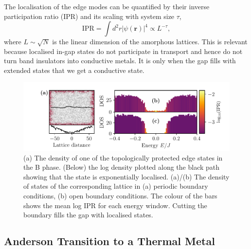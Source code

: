 The localisation of the edge modes can be quantified by their inverse participation ratio (IPR) and its scaling with system size \(\tau\), \[\mathrm{IPR} = \int d^2r|\psi(\mathbf{r})|^4  \propto L^{-\tau},\] where \(L\sim\sqrt{N}\) is the linear dimension of the amorphous lattices. This is relevant because localised in-gap states do not participate in transport and hence do not turn band insulators into conductive metals. It is only when the gap fills with extended states that we get a conductive state.

\hypertarget{fig:edge_modes}{%
\begin{figure}
\centering
\includegraphics[width=1\textwidth,height=\textheight]{figure_code/amk_chapter/results/edge_modes/edge_modes}
\caption[{Edges States and Density of States}]{(a) The density of one of the topologically protected edge states in the B phase. (Below) the log density plotted along the black path showing that the state is exponentially localised. (a)/(b) The density of states of the corresponding lattice in (a) periodic boundary conditions, (b) open boundary conditions. The colour of the bars shows the mean log IPR for each energy window. Cutting the boundary fills the gap with localised states.}
\label{fig:edge_modes}
\end{figure}
}

\hypertarget{anderson-transition-to-a-thermal-metal}{%
\subsection{Anderson Transition to a Thermal Metal}\label{anderson-transition-to-a-thermal-metal}}

